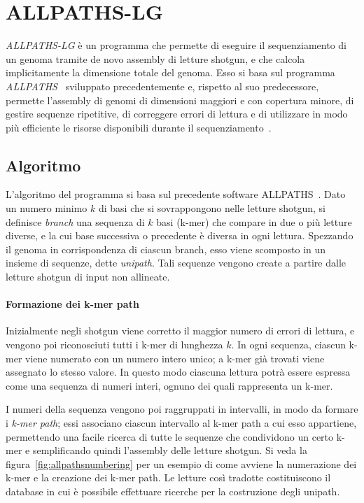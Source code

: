 \documentclass[crop=false, class=book]{standalone}
\begin{document}
	
	
	\section{ALLPATHS-LG}
	\label{sec:allpaths}
	\textit{ALLPATHS-LG} è un programma che permette di eseguire il sequenziamento di un genoma tramite de novo assembly di letture shotgun, e che calcola implicitamente la dimensione totale del genoma. Esso si basa sul programma \textit{ALLPATHS}~\cite{butler2008allpaths,maccallum2009allpaths2} sviluppato precedentemente e, rispetto al suo predecessore, permette l'assembly di genomi di dimensioni maggiori e con copertura minore, di gestire sequenze ripetitive, di correggere errori di lettura e di utilizzare in modo più efficiente le risorse disponibili durante il sequenziamento~\cite{gnerre2011high}. 
	
	
	\subsection{Algoritmo}
	L'algoritmo del programma si basa sul precedente software ALLPATHS~\cite{butler2008allpaths}. Dato un numero minimo $k$ di basi che si sovrappongono nelle letture shotgun, si definisce \textit{branch} una sequenza di $k$ basi (k-mer) che compare in due o più letture diverse, e la cui base successiva o precedente è diversa in ogni lettura. Spezzando il genoma in corrispondenza di ciascun branch, esso viene scomposto in un insieme di sequenze, dette \textit{unipath}. Tali sequenze vengono create a partire dalle letture shotgun di input non allineate. 
	
	\paragraph{Formazione dei k-mer path}
	Inizialmente negli shotgun viene corretto il maggior numero di errori di lettura, e vengono poi riconosciuti tutti i k-mer di lunghezza $k$. In ogni sequenza, ciascun k-mer viene numerato con un numero intero unico; a k-mer già trovati viene assegnato lo stesso valore. In questo modo ciascuna lettura potrà essere espressa come una sequenza di numeri interi, ognuno dei quali rappresenta un k-mer. 
	
	I numeri della sequenza vengono poi raggruppati in intervalli, in modo da formare i \textit{k-mer path}; essi associano ciascun intervallo al k-mer path a cui esso appartiene, permettendo una facile ricerca di tutte le sequenze che condividono un certo k-mer e semplificando quindi l'assembly delle letture shotgun. Si veda la figura~\vref{fig:allpathsnumbering} per un esempio di come avviene la numerazione dei k-mer e la creazione dei k-mer path.
	Le letture così tradotte costituiscono il database in cui è possibile effettuare ricerche per la costruzione degli unipath.
	
\end{document}
